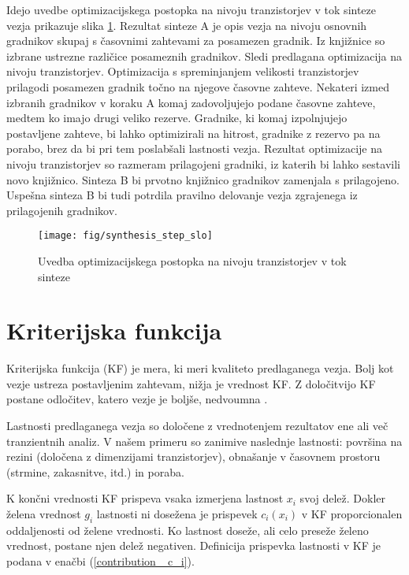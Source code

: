 \documentclass[journal,a4paper,twoside]{template/IEEEtran}
\begin{document}
Idejo uvedbe optimizacijskega postopka na nivoju tranzistorjev v tok sinteze vezja prikazuje slika \ref{synthesis_step}. Rezultat sinteze A je opis vezja na nivoju osnovnih gradnikov skupaj s časovnimi zahtevami za posamezen gradnik. Iz knjižnice so izbrane ustrezne različice posameznih gradnikov. Sledi predlagana optimizacija na nivoju tranzistorjev. Optimizacija s spreminjanjem velikosti tranzistorjev prilagodi posamezen gradnik točno na njegove časovne zahteve. Nekateri izmed izbranih gradnikov v koraku A komaj zadovoljujejo podane časovne zahteve, medtem ko imajo drugi veliko rezerve. Gradnike, ki komaj izpolnjujejo postavljene zahteve, bi lahko optimizirali na hitrost, gradnike z rezervo pa na porabo, brez da bi pri tem poslabšali lastnosti vezja. Rezultat optimizacije na nivoju tranzistorjev so razmeram prilagojeni gradniki, iz katerih bi lahko sestavili novo knjižnico. Sinteza B bi prvotno knjižnico gradnikov zamenjala s prilagojeno. Uspešna sinteza B bi tudi potrdila pravilno delovanje vezja zgrajenega iz prilagojenih gradnikov.

\begin{figure}[htb]
\centerline{\texttt{[image: fig/synthesis\_step\_slo]}}
\caption{Uvedba optimizacijskega postopka na nivoju tranzistorjev v tok sinteze}
\label{synthesis_step}
\end{figure}

\section{Kriterijska funkcija}
Kriterijska funkcija (KF) je mera, ki meri kvaliteto predlaganega vezja. Bolj kot vezje ustreza postavljenim zahtevam, nižja je vrednost KF. Z določitvijo KF postane odločitev, katero vezje je boljše, nedvoumna \cite{burmen1}.

Lastnosti predlaganega vezja so določene z vrednotenjem rezultatov ene ali več tranzientnih analiz. V našem primeru so zanimive naslednje lastnosti: površina na rezini (določena z dimenzijami tranzistorjev), obnašanje v časovnem prostoru (strmine, zakasnitve, itd.) in poraba.

K končni vrednosti KF prispeva vsaka izmerjena lastnost $x_i$ svoj delež. Dokler želena vrednost $g_i$ lastnosti ni dosežena je prispevek $c_i(x_i)$ v KF proporcionalen oddaljenosti od želene vrednosti. Ko lastnost doseže, ali celo preseže želeno vrednost, postane njen delež negativen. Definicija prispevka lastnosti v KF je podana v enačbi (\ref{contribution _c_i}).
\end{document}
